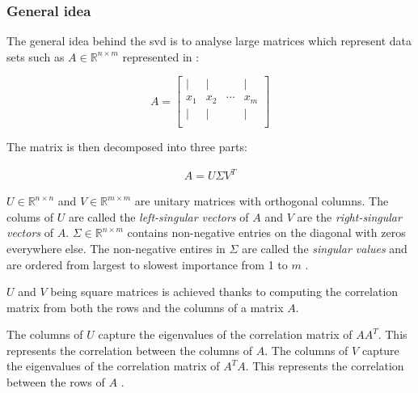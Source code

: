 \clearpage




\subsubsection{General idea}

The general idea behind the \gls{svd} is to analyse large matrices which represent data sets such as  $A \in \mathbb{R}^{n \times m}$ represented in :

\begin{equation}
	\label{formula:svdMatrixShape}
	A = 
	\begin{bmatrix}
		\mid & \mid & & \mid\\
		x_1 & x_2 & \cdots & x_m\\
		\mid & \mid & & \mid\\
	\end{bmatrix}
\end{equation}

\vspace*{4mm}

The matrix is then decomposed into three parts:

\vspace{-6mm}
\begin{align}
	\label{formula:svdBasic}
	A = U \Sigma V^T
\end{align}

$U \in \mathbb{R}^{n \times n}$ and $V \in \mathbb{R}^{m \times m}$ are unitary matrices with orthogonal columns.
The colums of $U$ are called the \emph{left-singular vectors} of $A$ and $V$ are the \emph{right-singular vectors} of $A$.
$\Sigma \in \mathbb{R}^{n \times m}$ contains non-negative entries on the diagonal with zeros everywhere else.
The non-negative entires in $\Sigma$ are called the \emph{singular values} and are ordered from largest to slowest importance from 1 to $m$ \cite{brunton2019data}.
\bigskip


$U$ and $V$ being square matrices is achieved thanks to computing the correlation matrix from both the rows and the columns of a matrix $A$.

The columns of $U$ capture the eigenvalues of the correlation matrix of $AA^T$.
This represents the correlation between the columns of $A$.
The columns of $V$ capture the eigenvalues of the correlation matrix of $A^TA$.
This represents the correlation between the rows of $A$ \cite{brunton2019data}.  %
\bigskip


